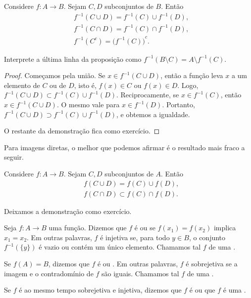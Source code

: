\begin{prop} \label{st:propinv}
Considere $f \colon A \to B$. Sejam $C, D$ subconjuntos de $B$. Então
\begin{align*}
& f^{-1}( C \cup D) = f^{-1} (C) \cup f^{-1} (D) , \\
& f^{-1}( C \cap D) = f^{-1} (C) \cap f^{-1} (D) , \\
& f^{-1}( C^c) = {\bigl( f^{-1} (C) \bigr)}^c .
\end{align*}
\end{prop}

Interprete a última linha da proposição como
$f^{-1}( B \setminus C) = A \setminus f^{-1} (C)$.

\begin{proof}
Começamos pela união. Se $x \in f^{-1}( C \cup D)$, então a função leva
$x$ a um elemento de $C$ ou de $D$, isto é, $f(x) \in C$ ou $f(x) \in D$.
Logo, $f^{-1}( C \cup D) \subset f^{-1} (C) \cup f^{-1} (D)$.
Reciprocamente, se $x \in f^{-1}(C)$, então $x \in f^{-1}(C \cup D)$.
O mesmo vale para $x \in f^{-1}(D)$. Portanto,
$f^{-1}( C \cup D) \supset f^{-1} (C) \cup f^{-1} (D)$, e obtemos a
igualdade.

O restante da demonstração fica como exercício.
\end{proof}

Para imagens diretas, o melhor que podemos afirmar é o resultado mais fraco
a seguir.

\begin{prop} \label{st:propfor}
Considere $f \colon A \to B$. Sejam $C, D$ subconjuntos de $A$. Então
\begin{align*}
& f( C \cup D) = f (C) \cup f (D) , \\
& f( C \cap D) \subset f (C) \cap f (D) .
\end{align*}
\end{prop}

Deixamos a demonstração como exercício.

\begin{defn}
Seja $f \colon A \to B$ uma função.
Dizemos que $f$ é
\emph{} ou
\emph{} se $f(x_1) = f(x_2)$ implica $x_1 = x_2$. Em
outras palavras, $f$ é injetiva se, para todo $y \in B$, o conjunto
$f^{-1}(\{y\})$ é vazio ou contém um único elemento.
Chamamos tal $f$ de uma \emph{}.

Se $f(A) = B$, dizemos que $f$ é
\emph{} ou
\emph{}.
Em outras palavras, $f$ é sobrejetiva se a imagem e o contradomínio de $f$
são iguais.
Chamamos tal $f$ de uma \emph{}.

Se $f$ é ao mesmo tempo sobrejetiva e injetiva, dizemos que $f$ é
\emph{} ou que $f$ é uma
\emph{}.
\end{defn}

